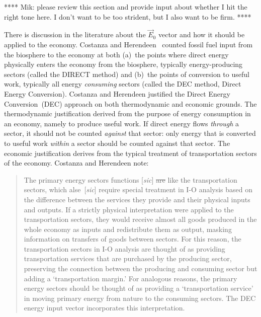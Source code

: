 **** Mik: please review this section and provide input
about whether I hit the right tone here.
I don't want to be too strident, but I also want to 
be firm. ****

There is discussion in the literature about the $\vec{E}_{0}$
vector and how it should be applied to the economy.
Costanza and Herendeen~\cite{Costanza:1984tq} counted fossil fuel input 
from the biosphere to the economy
at both (a)~the points where direct energy physically enters the economy 
from the biosphere, typically energy-producing sectors 
(called the DIRECT method) and 
(b)~the points of conversion to useful work, typically all energy \emph{consuming} sectors
(called the DEC method, 
Direct Energy Conversion). 
Costanza and Herendeen justified the Direct Energy Conversion~(DEC) 
approach on both thermodynamic and economic grounds. 
The thermodynamic justification derived from the purpose 
of energy consumption in an economy, 
namely to produce useful work. 
If direct energy flows \emph{through} a sector, 
it should not be counted \emph{against} that sector: 
only energy that is converted to useful work \emph{within} 
a sector should be counted against that sector.
The economic justification derives 
from the typical treatment of transportation sectors of the economy.
Costanza and Herendeen note:

\begin{quote}
	The primary energy sectors functions [\emph{sic}] \sout{are}
	like the transportation sectors, 
	which alse~[\emph{sic}] require special treatment in I-O analysis 
	based on the difference between the services they provide 
	and their physical inputs and outputs. 
	If a strictly physical interpretation were applied to the 
	transportation sectors, 
	they would receive almost all goods produced in the whole economy as inputs 
	and redistribute them as output, 
	masking information on transfers of goods between sectors. 
	For this reason, the transportation sectors in I-O analysis 
	are thought of as providing transportation services 
	that are purchased by the producing sector, 
	preserving the connection between the producing and consuming sector 
	but adding a `transportation margin.' 
	For analogous reasons, 
	the primary energy sectors should be thought of as providing a 
	`transportation service' in moving primary energy 
	from nature to the consuming sectors. 
	The DEC energy input vector incorporates this interpretation.\cite[p. 151]{Costanza:1984tq}
\end{quote}


